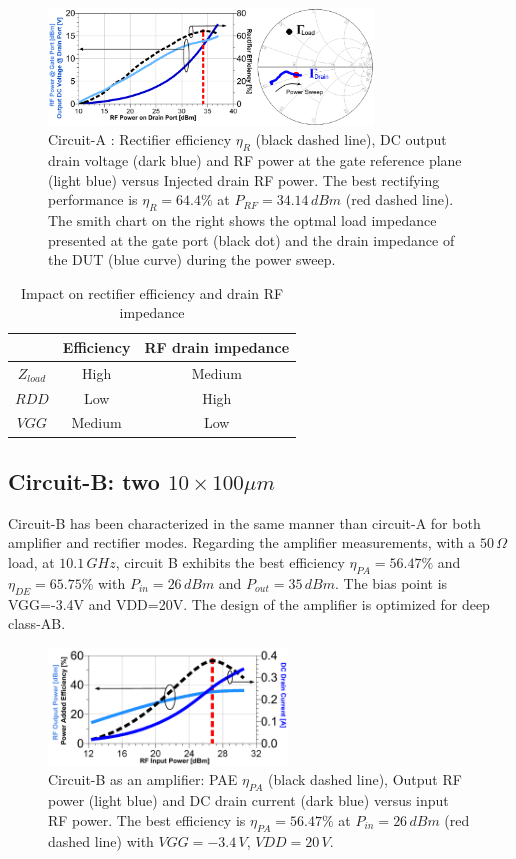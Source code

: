 \documentclass[conference]{IEEEtran}
\begin{document}
\begin{figure}[ht!] %
\centering
\includegraphics[width=3.4in]{IMS2014_Mike_Rectifier.pdf}
\caption{ Circuit-A :  Rectifier efficiency $\eta_R$ (black dashed line), DC output drain voltage (dark blue) and RF power at the gate reference plane (light blue) versus Injected drain RF power. The best rectifying performance is $\eta_R=64.4\%$ at $P_{RF}=34.14\,dBm$ (red dashed line). The smith chart on the right shows the optmal load impedance presented at the gate port (black dot) and the drain impedance of the DUT (blue curve) during the power sweep.
}
\label{mike_rect}
\end{figure}

\begin{table}[ht]
\caption{Impact on rectifier efficiency and drain RF impedance} %
\centering
\begin{tabular}{|c| c | c |  }
\hline
 &Efficiency & RF drain impedance\\
\hline
$Z_{load}$ & High & Medium\\
$RDD$ & Low & High\\
$VGG$ & Medium & Low\\
\hline
\end{tabular}
\label{tab:var}
\end{table}



\subsection{Circuit-B: two $10\times100\mu m$}
Circuit-B has been characterized in the same manner than circuit-A for both amplifier and rectifier modes.
Regarding the amplifier measurements, with a $50\,\Omega$ load, at $10.1\,GHz$, circuit B exhibits the best efficiency $\eta_{PA}=56.47\%$ and $\eta_{DE}=65.75\%$ with $P_{in}=26\,dBm$ and  $P_{out}=35\,dBm$. The bias point is VGG=-3.4V and VDD=20V.
The design of the amplifier is optimized for deep class-AB.

\begin{figure}[ht!] %
\centering
\includegraphics[width=2.5in]{IMS2014_Scott_Amplifier.pdf}
\caption{ Circuit-B as an amplifier:  PAE $\eta_{PA}$ (black dashed line), Output RF power (light blue) and DC drain current (dark blue) versus input RF power. The best efficiency is $\eta_{PA}=56.47\%$ at $P_{in}=26\,dBm$ (red dashed line) with $VGG=-3.4\,V$, $VDD=20\,V$.
 }
\label{scott_amp}
\end{figure}
\end{document}
